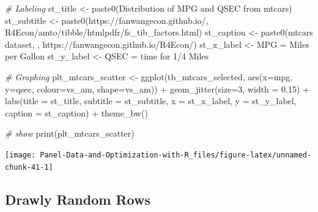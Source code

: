 \documentclass[
]{book}
\newenvironment{Shaded}{\begin{snugshade}}{\end{snugshade}}
\newcommand{\AttributeTok}[1]{\textcolor[rgb]{0.77,0.63,0.00}{#1}}
\newcommand{\CommentTok}[1]{\textcolor[rgb]{0.56,0.35,0.01}{\textit{#1}}}
\newcommand{\DecValTok}[1]{\textcolor[rgb]{0.00,0.00,0.81}{#1}}
\newcommand{\FloatTok}[1]{\textcolor[rgb]{0.00,0.00,0.81}{#1}}
\newcommand{\FunctionTok}[1]{\textcolor[rgb]{0.00,0.00,0.00}{#1}}
\newcommand{\NormalTok}[1]{#1}
\newcommand{\OtherTok}[1]{\textcolor[rgb]{0.56,0.35,0.01}{#1}}
\newcommand{\SpecialCharTok}[1]{\textcolor[rgb]{0.00,0.00,0.00}{#1}}
\newcommand{\StringTok}[1]{\textcolor[rgb]{0.31,0.60,0.02}{#1}}
\begin{document}
\begin{Shaded}
\begin{Highlighting}[]
\CommentTok{\# Labeling}
\NormalTok{st\_title }\OtherTok{\textless{}{-}} \FunctionTok{paste0}\NormalTok{(}\StringTok{\textquotesingle{}Distribution of MPG and QSEC from mtcars\textquotesingle{}}\NormalTok{)}
\NormalTok{st\_subtitle }\OtherTok{\textless{}{-}} \FunctionTok{paste0}\NormalTok{(}\StringTok{\textquotesingle{}https://fanwangecon.github.io/\textquotesingle{}}\NormalTok{,}
                      \StringTok{\textquotesingle{}R4Econ/amto/tibble/htmlpdfr/fs\_tib\_factors.html\textquotesingle{}}\NormalTok{)}
\NormalTok{st\_caption }\OtherTok{\textless{}{-}} \FunctionTok{paste0}\NormalTok{(}\StringTok{\textquotesingle{}mtcars dataset, \textquotesingle{}}\NormalTok{,}
                     \StringTok{\textquotesingle{}https://fanwangecon.github.io/R4Econ/\textquotesingle{}}\NormalTok{)}
\NormalTok{st\_x\_label }\OtherTok{\textless{}{-}} \StringTok{\textquotesingle{}MPG = Miles per Gallon\textquotesingle{}}
\NormalTok{st\_y\_label }\OtherTok{\textless{}{-}} \StringTok{\textquotesingle{}QSEC = time for 1/4 Miles\textquotesingle{}}

\CommentTok{\# Graphing}
\NormalTok{plt\_mtcars\_scatter }\OtherTok{\textless{}{-}} 
  \FunctionTok{ggplot}\NormalTok{(tb\_mtcars\_selected, }
         \FunctionTok{aes}\NormalTok{(}\AttributeTok{x=}\NormalTok{mpg, }\AttributeTok{y=}\NormalTok{qsec, }\AttributeTok{colour=}\NormalTok{vs\_am, }\AttributeTok{shape=}\NormalTok{vs\_am)) }\SpecialCharTok{+}
  \FunctionTok{geom\_jitter}\NormalTok{(}\AttributeTok{size=}\DecValTok{3}\NormalTok{, }\AttributeTok{width =} \FloatTok{0.15}\NormalTok{) }\SpecialCharTok{+}
  \FunctionTok{labs}\NormalTok{(}\AttributeTok{title =}\NormalTok{ st\_title, }\AttributeTok{subtitle =}\NormalTok{ st\_subtitle,}
       \AttributeTok{x =}\NormalTok{ st\_x\_label, }\AttributeTok{y =}\NormalTok{ st\_y\_label, }\AttributeTok{caption =}\NormalTok{ st\_caption) }\SpecialCharTok{+}
  \FunctionTok{theme\_bw}\NormalTok{()}

\CommentTok{\# show}
\FunctionTok{print}\NormalTok{(plt\_mtcars\_scatter)}
\end{Highlighting}
\end{Shaded}

\begin{center}\texttt{[image: Panel-Data-and-Optimization-with-R\_files/figure-latex/unnamed-chunk-41-1]} \end{center}

\hypertarget{drawly-random-rows}{%
\subsection{Drawly Random Rows}\label{drawly-random-rows}}
\end{document}
